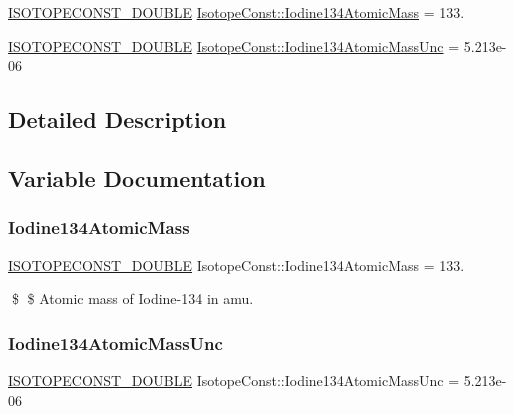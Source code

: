 \begin{DoxyCompactItemize}
\item 
\mbox{\hyperlink{group___isotope_const-_macros_ga8f45a7272ce02c0b4c65c44636ed719a}{I\+S\+O\+T\+O\+P\+E\+C\+O\+N\+S\+T\+\_\+\+D\+O\+U\+B\+LE}} \mbox{\hyperlink{group___isotope_const-_iodine-_i134_gab3677c0c4503d4376911800fac0f7d74}{Isotope\+Const\+::\+Iodine134\+Atomic\+Mass}} = 133.
\item 
\mbox{\hyperlink{group___isotope_const-_macros_ga8f45a7272ce02c0b4c65c44636ed719a}{I\+S\+O\+T\+O\+P\+E\+C\+O\+N\+S\+T\+\_\+\+D\+O\+U\+B\+LE}} \mbox{\hyperlink{group___isotope_const-_iodine-_i134_ga276b43bff5a2be42230f81c9c424eecc}{Isotope\+Const\+::\+Iodine134\+Atomic\+Mass\+Unc}} = 5.\+213e-\/06
\end{DoxyCompactItemize}


\subsection{Detailed Description}


\subsection{Variable Documentation}
\mbox{\label{group___isotope_const-_iodine-_i134_gab3677c0c4503d4376911800fac0f7d74}} 
\subsubsection{\texorpdfstring{Iodine134\+Atomic\+Mass}{Iodine134AtomicMass}}
{\footnotesize\ttfamily \mbox{\hyperlink{group___isotope_const-_macros_ga8f45a7272ce02c0b4c65c44636ed719a}{I\+S\+O\+T\+O\+P\+E\+C\+O\+N\+S\+T\+\_\+\+D\+O\+U\+B\+LE}} Isotope\+Const\+::\+Iodine134\+Atomic\+Mass = 133.}

\$ \$ Atomic mass of Iodine-\/134 in amu. \mbox{\label{group___isotope_const-_iodine-_i134_ga276b43bff5a2be42230f81c9c424eecc}} 
\subsubsection{\texorpdfstring{Iodine134\+Atomic\+Mass\+Unc}{Iodine134AtomicMassUnc}}
{\footnotesize\ttfamily \mbox{\hyperlink{group___isotope_const-_macros_ga8f45a7272ce02c0b4c65c44636ed719a}{I\+S\+O\+T\+O\+P\+E\+C\+O\+N\+S\+T\+\_\+\+D\+O\+U\+B\+LE}} Isotope\+Const\+::\+Iodine134\+Atomic\+Mass\+Unc = 5.\+213e-\/06}

